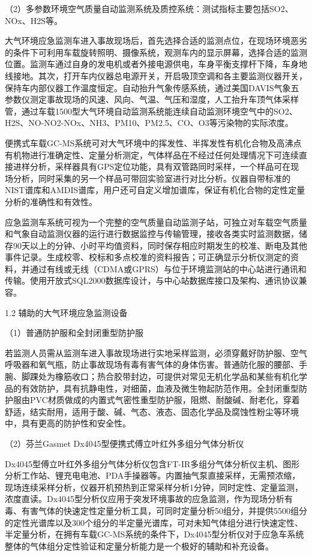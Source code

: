 \documentclass[]{book}
\begin{document}
（2）多参数环境空气质量自动监测系统及质控系统：测试指标主要包括SO2、NOx、H2S等。

大气环境应急监测车进入事故现场后，首先选择合适的监测点位，在现场环境恶劣的条件下可利用车载旋转照明、摄像系统，观测车内的显示屏幕，选择合适的监测位置。监测车通过自身的发电机或者外接电源供电，车身平衡支撑杆下降，车身地线接地。其次，打开车内仪器总电源开关，开启吸顶空调和各主要监测仪器开关，保持车内部仪器工作温度恒定。自动抬升气象传感系统，通过美国DAVIS气象五参数仪测定事故现场的风速、风向、气温、气压和湿度，人工抬升车顶气体采样管，通过车载1500型大气环境自动监测系统能连续自动监测环境空气中的SO2、H2S、NO-NO2-NOx、NH3、PM10、PM2.5、CO、O3等污染物的实际浓度。

便携式车载GC-MS系统可对大气环境中的挥发性、半挥发性有机化合物及高沸点有机物进行准确定性、定量分析测定，气体样品在不经过任何处理情况下可连续直接进样分析，采样器具有GPS定位功能，具有双管路同时采样，一个样品可在现场分析，同时采集的另一个样品可带回实验室进行对比分析。仪器自带标准的NIST谱库和AMDIS谱库，用户还可自定义增加谱库，保证有机化合物的定性定量分析的准确性和有效性。

应急监测车系统可视为一个完整的空气质量自动监测子站，可独立对车载空气质量和气象自动监测仪器的运行进行数据监控与传输管理，接收各类实时监测数据，储存90天以上的分钟、小时平均值资料，同时保存相应时期发生的校准、断电及其他事件记录。生成校零、校标和多点校准的资料报告；可正确显示分析仪测定的资料，并通过有线或无线（CDMA或GPRS）与位于环境监测站的中心站进行通讯和传输。使用开放式SQL2000数据库设计，与中心站数据库接口及架构、通讯协议兼容。

1.2 辅助的大气环境应急监测设备

（1）普通防护服和全封闭重型防护服

若监测人员需从监测车进入事故现场进行实地采样监测，必须穿戴好防护服、空气呼吸器和氧气瓶，防止事故现场有毒有害气体的身体伤害。普通防化服的腰部、手腕、脚踝处为橡筋收口；热合胶带封边，可提供对常见无机化学品和某些有机化学品的有效防护，具有抗静电性，对细菌，血液及微生物起防范作用。全封闭重型防护服由PVC材质做成的内置式气密性重型防护服，阻燃、耐酸碱、耐老化，穿着舒适，结实耐用，适用于酸、碱、气态、液态、固态化学品及腐蚀性粉尘等环境中，具有更高的防护性和安全性。

（2）芬兰Gasmet Dx4045型便携式傅立叶红外多组分气体分析仪

Dx4045型傅立叶红外多组分气体分析仪包含FT-IR多组分气体分析仪主机、图形分析工作站、锂充电电池、PDA手操器等。内置抽气泵直接采样，无需预浓缩，现场连续采样分析，仪器开机预热到正常采样分析1分钟，同时定性、定量监测，浓度直读。Dx4045型分析仪应用于突发环境事故的应急监测，作为现场分析有毒、有害气体的快速定性定量分析工具，可同时定量分析50组分，并提供5500组分的定性光谱库以及300个组分的半定量光谱库，可对未知气体组分进行快速定性、半定量分析，在拥有车载GC-MS系统的条件下，Dx4045型分析仪对于应急车系统整体的气体组分定性验证和定量分析能力是一个极好的辅助和补充设备。
\end{document}
